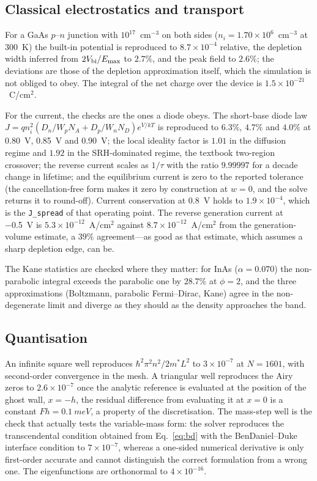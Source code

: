 \documentclass[preprint,12pt]{elsarticle}
\begin{document}
\subsection{Classical electrostatics and transport}

For a GaAs $p$--$n$ junction with $10^{17}$~cm$^{-3}$ on both sides
($n_i=1.70\times10^{6}$~cm$^{-3}$ at \SI{300}{K}) the built-in potential is
reproduced to $8.7\times10^{-4}$ relative, the depletion width inferred from
$2V_{\rm bi}/E_{\max}$ to $2.7\%$, and the peak field to $2.6\%$; the
deviations are those of the depletion approximation itself, which the
simulation is not obliged to obey. The integral of the net charge over the
device is $1.5\times10^{-21}$~C/cm$^2$.

For the current, the checks are the ones a diode obeys. The short-base diode
law $J=qn_i^2(D_n/W_pN_A+D_p/W_nN_D)e^{V/kT}$ is reproduced to $6.3\%$,
$4.7\%$ and $4.0\%$ at \SI{0.80}{V}, \SI{0.85}{V} and \SI{0.90}{V}; the local
ideality factor is $1.01$ in the diffusion regime and $1.92$ in the
SRH-dominated regime, the textbook two-region crossover; the reverse current
scales as $1/\tau$ with the ratio $9.99997$ for a decade change in lifetime;
and the equilibrium current is zero to the reported tolerance (the
cancellation-free form makes it zero by construction at $w=0$, and the solve
returns it to round-off). Current conservation at
\SI{0.8}{V} holds to $1.9\times10^{-4}$, which is the \texttt{J\_spread} of
that operating point. The reverse generation current at \SI{-0.5}{V} is
$5.3\times10^{-12}$~A/cm$^2$ against $8.7\times10^{-12}$~A/cm$^2$ from the
generation-volume estimate, a $39\%$ agreement---as good as that estimate,
which assumes a sharp depletion edge, can be.

The Kane statistics are checked where they matter: for InAs
($\alpha=0.070$) the non-parabolic integral exceeds the parabolic one by
$28.7\%$ at $\phi=2$, and the three approximations (Boltzmann, parabolic
Fermi--Dirac, Kane) agree in the non-degenerate limit and diverge as they
should as the density approaches the band.

\subsection{Quantisation}

An infinite square well reproduces $\hbar^2\pi^2n^2/2m^{*}L^2$ to
$3\times10^{-7}$ at $N=1601$, with second-order convergence in the mesh. A
triangular well reproduces the Airy zeros to $2.6\times10^{-7}$ once the
analytic reference is evaluated at the position of the ghost wall, $x=-h$,
the residual difference from evaluating it at $x=0$ is a constant
$Fh=\SI{0.1}{meV}$, a property of the discretisation. The mass-step well is the check
that actually tests the variable-mass form: the solver reproduces the
transcendental condition obtained from Eq.~\eqref{eq:bd} with the
BenDaniel--Duke interface condition to $7\times10^{-7}$, whereas a one-sided
numerical derivative is only first-order accurate and cannot distinguish the
correct formulation from a wrong one. The eigenfunctions are orthonormal to
$4\times10^{-16}$.
\end{document}

